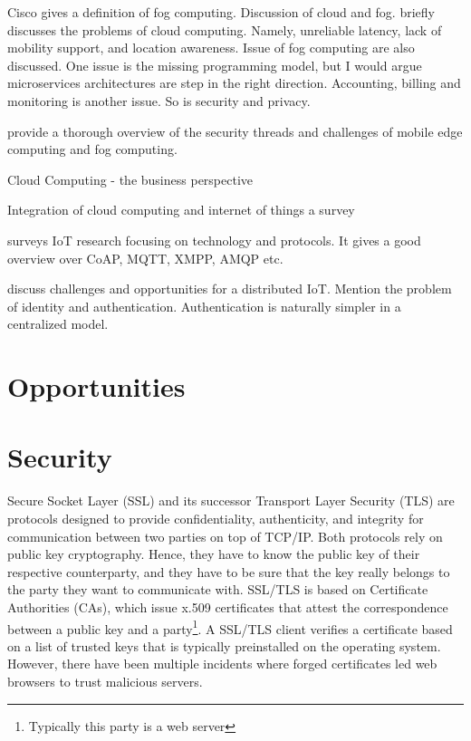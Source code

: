 Cisco gives a definition of fog computing.
Discussion of cloud and fog. \cite{Yi:2015:SFC:2757384.2757397} briefly discusses the problems of cloud computing. Namely, unreliable latency, lack of mobility support, and location awareness. Issue of fog computing are also discussed. One issue is the missing programming model, but I would argue microservices architectures are step in the right direction. Accounting, billing and monitoring is another issue. So is security and privacy.


\cite{DBLP:journals/corr/RomanLM16} provide a thorough overview of the security threads and challenges of mobile edge computing and fog computing.


Cloud Computing - the business perspective\cite{Marston2011176}

Integration of cloud computing and internet of things a survey \cite{botta2016integration}

\cite{7123563} surveys IoT research focusing on technology and protocols. It gives a good overview over CoAP, MQTT, XMPP, AMQP etc.

\cite{Roman20132266} discuss challenges and opportunities for a distributed IoT. Mention the problem of identity and authentication. Authentication is naturally simpler in a centralized model.

\section{Opportunities}

\section{Security}

Secure Socket Layer (SSL) and its successor Transport Layer Security (TLS) are protocols designed to provide confidentiality, authenticity, and integrity for communication between two parties on top of TCP/IP. Both protocols rely on public key cryptography. Hence, they have to know the public key of their respective counterparty, and they have to be sure that the key really belongs to the party they want to communicate with. SSL/TLS is based on Certificate Authorities (CAs), which issue x.509 certificates that attest the correspondence between a public key and a party\footnote{Typically this party is a web server}. A SSL/TLS client verifies a certificate based on a list of trusted keys that is typically preinstalled on the operating system. However, there have been multiple incidents where forged certificates led web browsers to trust malicious servers. 



